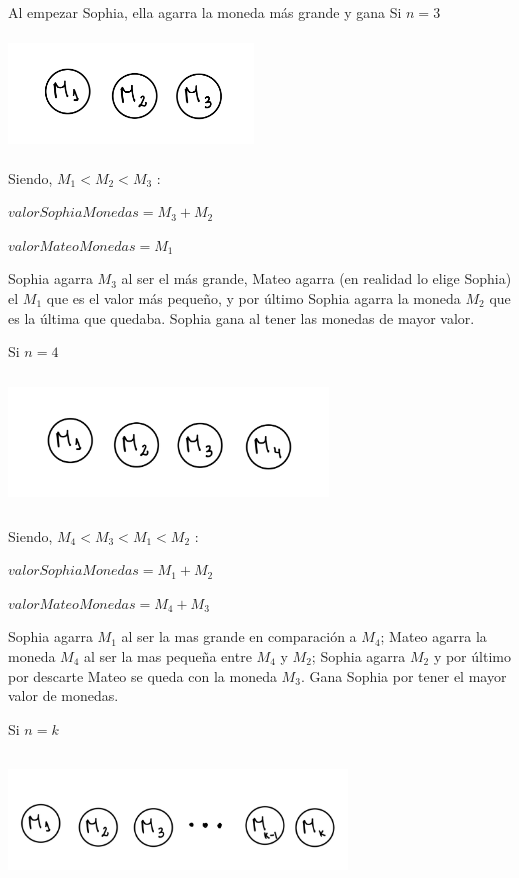 Al empezar Sophia, ella agarra la moneda más grande y gana
\vskip1cm
Si $n=3$

\includegraphics[width=6.5cm, height=3cm]{images/IMG_1627.jpg}

Siendo, $M_{1}<M_{2}<M_{3}$ : 


$valorSophiaMonedas=M_{3}+M_{2}$

$valorMateoMonedas=M_{1}$

Sophia agarra $M_{3}$ al ser el más grande, Mateo agarra (en realidad lo elige Sophia) el $M_{1}$ que es el valor
más pequeño, y por último Sophia agarra la moneda $M_{2}$ que es la última que quedaba. 
Sophia gana al tener las monedas de mayor valor.

\vskip1cm
Si $n=4$

\includegraphics[width=8.5cm, height=3.5cm]{images/IMG_1628.jpg}

Siendo, $M_{4}<M_{3}<M_{1}<M_{2}$ : 

$valorSophiaMonedas=M_{1}+M_{2}$

$valorMateoMonedas=M_{4}+M_{3}$

Sophia agarra $M_{1}$ al ser la mas grande en comparación a $M_{4}$; Mateo agarra la moneda $M_{4}$ al ser la mas 
pequeña entre $M_{4}$ y $M_{2}$; Sophia agarra $M_{2}$ y por último por descarte Mateo se queda con la moneda $M_{3}$.
Gana Sophia por tener el mayor valor de monedas.

\vskip1cm
Si $n=k$

\includegraphics[width=9cm, height=3.5cm]{images/IMG_1629.jpg}

